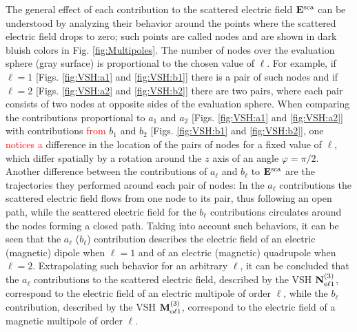 The general effect of each contribution to the scattered electric field  $\vb{E}^\text{sca}$  can be understood by analyzing their behavior around the points where the scattered electric field drops to  zero; such points are called nodes and are shown in dark bluish colors in  Fig. \ref{fig:Multipoles}. The number of nodes over the evaluation sphere (gray surface) is proportional to the chosen value of $\ell$. For example, if $\ell = 1$ [Figs. \ref{fig:VSH:a1} and \ref{fig:VSH:b1}] there is a pair of such nodes and if $\ell = 2$ [Figs. \ref{fig:VSH:a2} and \ref{fig:VSH:b2}] there are two pairs, where each pair consists of two nodes at opposite sides of the evaluation sphere. When comparing the contributions proportional to $a_1$ and $a_2$ [Figs. \ref{fig:VSH:a1} and \ref{fig:VSH:a2}] with contributions \textcolor{red}{from} $b_1$ and $b_2$ [Figs. \ref{fig:VSH:b1} and \ref{fig:VSH:b2}], one \textcolor{red}{notices a} difference in the location of the pairs of nodes for a fixed value of $\ell$, which differ spatially by a rotation around the $z$ axis of an angle $\varphi = \pi/2$.  Another difference between the contributions of $a_\ell$ and  $b_\ell$ to  $\vb{E}^\text{sca}$ are the trajectories they performed around each pair of nodes: In the $a_\ell$ contributions the scattered electric field flows from one node to its pair, thus following an open path, while the scattered electric field for the $b_\ell$ contributions circulates around the nodes forming a closed path. Taking into account such behaviors, it can be seen that the $a_\ell$ ($b_\ell$) contribution describes the electric field of an electric (magnetic) dipole when $\ell = 1$ and of an electric (magnetic) quadrupole when $\ell = 2$. Extrapolating such behavior for an arbitrary $\ell$,  it can be concluded that the $a_\ell$ contributions to the scattered electric field, described by the VSH $\vb{N}^{(3)}_{\text{e}\ell 1}$, correspond to the electric field of an electric multipole of order $\ell$, while the $b_\ell$ contribution, described by the VSH $\vb{M}^{(3)}_{\text{o}\ell 1}$, correspond to the electric field of a magnetic multipole of order $\ell$.

